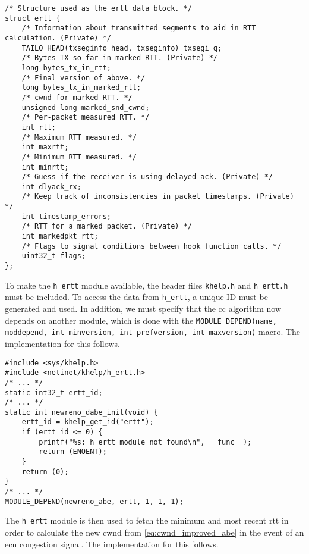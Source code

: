 \begin{code}
\begin{verbatim}
/* Structure used as the ertt data block. */
struct ertt {
    /* Information about transmitted segments to aid in RTT calculation. (Private) */
    TAILQ_HEAD(txseginfo_head, txseginfo) txsegi_q;
    /* Bytes TX so far in marked RTT. (Private) */
    long bytes_tx_in_rtt;
    /* Final version of above. */
    long bytes_tx_in_marked_rtt;
    /* cwnd for marked RTT. */
    unsigned long marked_snd_cwnd;
    /* Per-packet measured RTT. */
    int	rtt;
    /* Maximum RTT measured. */
    int	maxrtt;
    /* Minimum RTT measured. */
    int	minrtt;
    /* Guess if the receiver is using delayed ack. (Private) */
    int	dlyack_rx;
    /* Keep track of inconsistencies in packet timestamps. (Private) */
    int	timestamp_errors;
    /* RTT for a marked packet. (Private) */
    int	markedpkt_rtt;
    /* Flags to signal conditions between hook function calls. */
    uint32_t flags;
};
\end{verbatim}
\label{code:ertt.h}
\end{code}

To make the \lstinline{h_ertt} module available, the header files \lstinline{khelp.h} and \lstinline{h_ertt.h} must be included. To access the data from \lstinline{h_ertt}, a unique ID must be generated and used. In addition, we must specify that the \gls{cc} algorithm now depends on another module, which is done with the \lstinline{MODULE_DEPEND(name, moddepend, int minversion, int prefversion, int maxversion)} macro. The implementation for this follows.

\begin{verbatim}
#include <sys/khelp.h>
#include <netinet/khelp/h_ertt.h>
/* ... */
static int32_t ertt_id;
/* ... */
static int newreno_dabe_init(void) {
	ertt_id = khelp_get_id("ertt");
	if (ertt_id <= 0) {
		printf("%s: h_ertt module not found\n", __func__);
		return (ENOENT);
	}
	return (0);
}
/* ... */
MODULE_DEPEND(newreno_abe, ertt, 1, 1, 1);
\end{verbatim}
The \lstinline{h_ertt} module is then used to fetch the minimum and most recent \gls{rtt} in order to calculate the new \gls{cwnd} from \ref{eq:cwnd_improved_abe} in the event of an \gls{ecn} congestion signal. The implementation for this follows.


